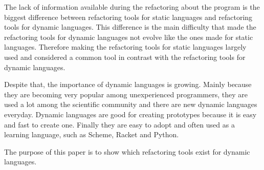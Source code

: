The lack of information available during the refactoring about the program is the biggest difference between refactoring tools for static languages and refactoring tools for dynamic languages.
This difference is the main difficulty that made the refactoring tools for dynamic languages not evolve like the ones made for static languages. 
Therefore making the refactoring tools for static languages largely used and considered a common tool in contrast with the refactoring tools for dynamic languages.  %

Despite that, the importance of dynamic languages is growing.
Mainly because they are becoming very popular among unexperienced programmers, they are used a lot among the scientific community and there are new dynamic languages everyday. 
Dynamic languages are good for creating prototypes because it is easy and fast to create one. 
Finally they are easy to adopt and often used as a learning language, such as Scheme, Racket and Python. %


The purpose of this paper is to show which refactoring tools exist for dynamic languages. %








